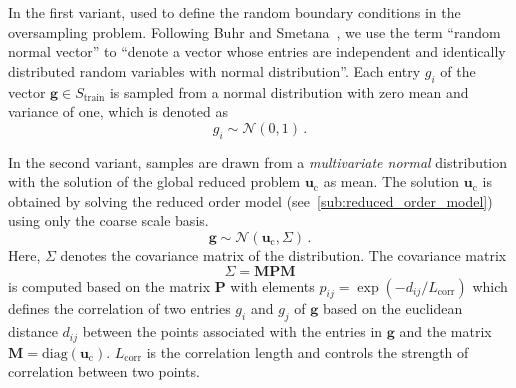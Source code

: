\documentclass[AMA,STIX1COL,doublespace]{WileyNJD-v2}
\begin{document}
In the first variant,  used to define
the random boundary conditions in the oversampling problem.
Following Buhr and Smetana~\cite{BS2018}, we use the term \enquote{random normal vector}
to \enquote{denote a vector whose entries are independent and identically
    distributed random variables with normal distribution}.
Each entry $g_i$ of the vector $\bm{g}\in S_{\mathrm{train}}$ is sampled from a
normal distribution with zero mean and variance of one, which is denoted as
\begin{equation}
	g_i \sim\mathcal{N}(0, 1)\,.
\end{equation}

In the second variant,  samples are drawn from a \textit{multivariate normal} distribution
with the solution of the global reduced problem $\bm{u}_{\mathrm{c}}$ as mean.
The solution $\bm{u}_{\mathrm{c}}$ is obtained by solving the reduced order model
(see~\cref{sub:reduced_order_model})
using only the coarse scale basis.
\begin{equation}
	\bm{g}\sim\mathcal{N}(\bm{u}_{\mathrm{c}}, \bm{\varSigma})\,.
\end{equation}
Here, $\bm{\varSigma}$ denotes the covariance matrix of the distribution.
The covariance matrix 
\begin{equation}
	\bm{\varSigma} = \bm{M}\bm{P}\bm{M}
\end{equation}
is computed based on the matrix $\bm{P}$ with elements $p_{ij}= \exp(-d_{ij}/L_{\mathrm{corr}})$ which
defines the correlation of two entries $g_i$ and $g_j$ of $\bm{g}$ based on the euclidean distance $d_{ij}$ between the points associated with the entries in $\bm{g}$ and the matrix $\bm{M} = \mathrm{diag}(\bm{u}_{\mathrm{c}})$.
$L_{\mathrm{corr}}$ is the correlation length and controls the strength of correlation
between two points.
\end{document}
